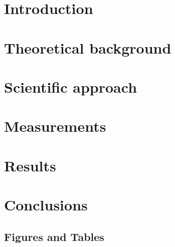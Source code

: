 \documentclass[conference]{IEEEtran}
\begin{document}
\section{Introduction}



\section{Theoretical background}







\section{Scientific approach}



\section{Measurements}









\section{Results}







\section{Conclusions}


\subsection{Figures and Tables}

\listoffigures
\listoftables

\printbibliography
\end{document}
